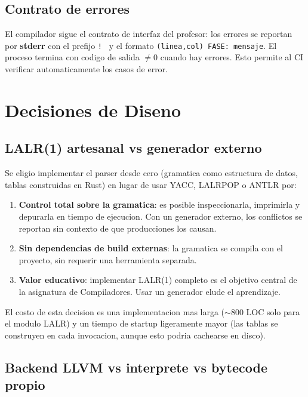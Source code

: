 \documentclass[12pt,a4paper]{article}
\begin{document}
\subsection{Contrato de errores}

El compilador sigue el contrato de interfaz del profesor: los errores se reportan
por \textbf{stderr} con el prefijo \texttt{!\ } y el formato
\texttt{(linea,col) FASE: mensaje}. El proceso termina con codigo de salida $\neq 0$
cuando hay errores. Esto permite al CI verificar automaticamente los casos de error.

\section{Decisiones de Diseno}
\label{sec:decisions}

\subsection{LALR(1) artesanal vs generador externo}

Se eligio implementar el parser desde cero (gramatica como estructura de datos,
tablas construidas en Rust) en lugar de usar YACC, LALRPOP o ANTLR por:

\begin{enumerate}
  \item \textbf{Control total sobre la gramatica}: es posible inspeccionarla,
    imprimirla y depurarla en tiempo de ejecucion. Con un generador externo, los
    conflictos se reportan sin contexto de que producciones los causan.
  \item \textbf{Sin dependencias de build externas}: la gramatica se compila con
    el proyecto, sin requerir una herramienta separada.
  \item \textbf{Valor educativo}: implementar LALR(1) completo es el objetivo central
    de la asignatura de Compiladores. Usar un generador elude el aprendizaje.
\end{enumerate}

El costo de esta decision es una implementacion mas larga ($\sim$800 LOC solo para el
modulo LALR) y un tiempo de startup ligeramente mayor (las tablas se construyen en
cada invocacion, aunque esto podria cachearse en disco).

\subsection{Backend LLVM vs interprete vs bytecode propio}
\end{document}
